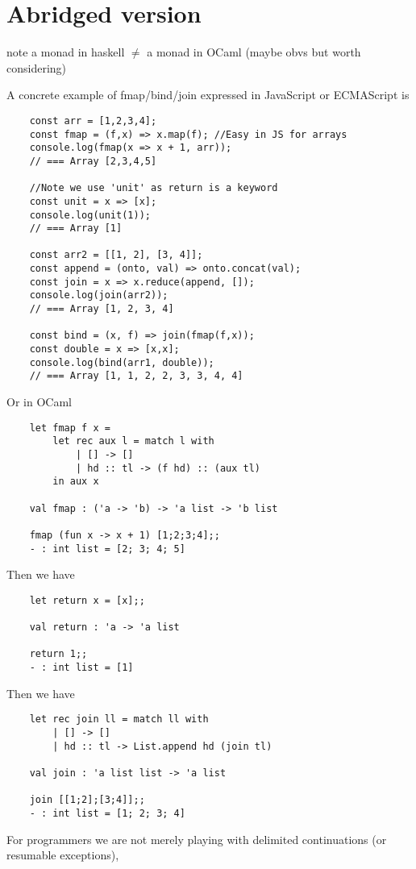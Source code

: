 \section{Abridged version}

note a monad in haskell $\neq$ a monad in OCaml
(maybe obvs but worth considering)

A concrete example of fmap/bind/join expressed in JavaScript or ECMAScript is
\begin{verbatim}
    const arr = [1,2,3,4];
    const fmap = (f,x) => x.map(f); //Easy in JS for arrays
    console.log(fmap(x => x + 1, arr));
    // === Array [2,3,4,5]

    //Note we use 'unit' as return is a keyword
    const unit = x => [x];
    console.log(unit(1));
    // === Array [1]

    const arr2 = [[1, 2], [3, 4]];
    const append = (onto, val) => onto.concat(val);
    const join = x => x.reduce(append, []);
    console.log(join(arr2));
    // === Array [1, 2, 3, 4]

    const bind = (x, f) => join(fmap(f,x));
    const double = x => [x,x];
    console.log(bind(arr1, double));
    // === Array [1, 1, 2, 2, 3, 3, 4, 4]
\end{verbatim}


Or in OCaml
\begin{verbatim}
    let fmap f x =
        let rec aux l = match l with
            | [] -> []
            | hd :: tl -> (f hd) :: (aux tl)
        in aux x

    val fmap : ('a -> 'b) -> 'a list -> 'b list

    fmap (fun x -> x + 1) [1;2;3;4];;
    - : int list = [2; 3; 4; 5]
\end{verbatim}
Then we have
\begin{verbatim}
    let return x = [x];;

    val return : 'a -> 'a list

    return 1;;
    - : int list = [1]
\end{verbatim}
Then we have
\begin{verbatim}
    let rec join ll = match ll with
        | [] -> []
        | hd :: tl -> List.append hd (join tl)

    val join : 'a list list -> 'a list

    join [[1;2];[3;4]];;
    - : int list = [1; 2; 3; 4]
\end{verbatim}



For programmers
we are not merely playing with delimited continuations (or resumable exceptions),

